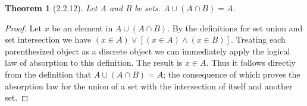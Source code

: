 \documentclass[a4paper, 12pt]{article}
\theoremstyle{plain}
\newtheorem*{theorem*}{Theorem}
\begin{document}
	
	\begin{theorem*}[2.2.12]
		Let A and B be sets. $A \cup (A \cap B) = A$.
	\end{theorem*}
	
	\begin{proof}
		Let $x$ be an element in $A \cup (A \cap B)$. By the definitions for set union and set intersection we have $(x \in A) \lor [(x \in A) \land (x \in B)]$. Treating each parenthesized object as a discrete object we can immediately apply the logical law of absorption to this definition. The result is $x \in A$. Thus it follows directly from the definition that $A \cup (A \cap B) = A$; the consequence of which proves the absorption law for the union of a set with the intersection of itself and another set.
	\end{proof}
\end{document}
